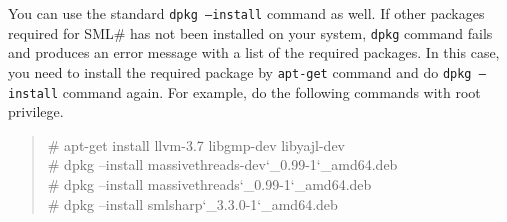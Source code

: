 \documentclass{jbook}
\newcommand{\smlsharp}{SML\#}
\newcommand{\version}{3.3.0}
\newenvironment{program}{\begin{quote}\begin{tt}}%
                        {\end{tt}\end{quote}}
\begin{document}
\begin{enumerate}
	You can use the standard {\tt dpkg --install} command as well.
	If other packages required for \smlsharp{} has not been installed
on your system, {\tt dpkg} command fails and produces an error message with
a list of the required packages.
	In this case, you need to install the required package by {\tt apt-get}
command and do {\tt dpkg --install} command again.
	For example, %
do the following commands with root privilege.
\begin{program}
\# apt-get install llvm-3.7 libgmp-dev libyajl-dev\\
\# dpkg --install massivethreads-dev\char`\_0.99-1\char`\_amd64.deb\\
\# dpkg --install massivethreads\char`\_0.99-1\char`\_amd64.deb\\
\# dpkg --install smlsharp\char`\_\version{}-1\char`\_amd64.deb
\end{program}
\end{enumerate}
\end{document}
